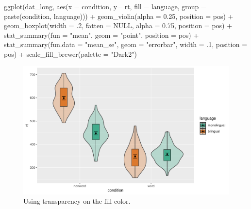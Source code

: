 \documentclass[
  english,
  doc,floatsintext]{apa6}
\newenvironment{Shaded}{\begin{snugshade}}{\end{snugshade}}
\newcommand{\AttributeTok}[1]{\textcolor[rgb]{0.77,0.63,0.00}{#1}}
\newcommand{\ConstantTok}[1]{\textcolor[rgb]{0.00,0.00,0.00}{#1}}
\newcommand{\DecValTok}[1]{\textcolor[rgb]{0.00,0.00,0.81}{#1}}
\newcommand{\FloatTok}[1]{\textcolor[rgb]{0.00,0.00,0.81}{#1}}
\newcommand{\FunctionTok}[1]{\textcolor[rgb]{0.00,0.00,0.00}{#1}}
\newcommand{\NormalTok}[1]{#1}
\newcommand{\SpecialCharTok}[1]{\textcolor[rgb]{0.00,0.00,0.00}{#1}}
\newcommand{\StringTok}[1]{\textcolor[rgb]{0.31,0.60,0.02}{#1}}
\begin{document}
\begin{Shaded}
\begin{Highlighting}[]
\FunctionTok{ggplot}\NormalTok{(dat\_long, }\FunctionTok{aes}\NormalTok{(}\AttributeTok{x =}\NormalTok{ condition, }\AttributeTok{y=}\NormalTok{ rt, }\AttributeTok{fill =}\NormalTok{ language, }
                     \AttributeTok{group =} \FunctionTok{paste}\NormalTok{(condition, language))) }\SpecialCharTok{+}
  \FunctionTok{geom\_violin}\NormalTok{(}\AttributeTok{alpha =} \FloatTok{0.25}\NormalTok{, }\AttributeTok{position =}\NormalTok{ pos) }\SpecialCharTok{+}
  \FunctionTok{geom\_boxplot}\NormalTok{(}\AttributeTok{width =}\NormalTok{ .}\DecValTok{2}\NormalTok{, }
               \AttributeTok{fatten =} \ConstantTok{NULL}\NormalTok{, }
               \AttributeTok{alpha =} \FloatTok{0.75}\NormalTok{,}
               \AttributeTok{position =}\NormalTok{ pos) }\SpecialCharTok{+}
  \FunctionTok{stat\_summary}\NormalTok{(}\AttributeTok{fun =} \StringTok{"mean"}\NormalTok{, }
               \AttributeTok{geom =} \StringTok{"point"}\NormalTok{, }
               \AttributeTok{position =}\NormalTok{ pos) }\SpecialCharTok{+}
  \FunctionTok{stat\_summary}\NormalTok{(}\AttributeTok{fun.data =} \StringTok{"mean\_se"}\NormalTok{, }
               \AttributeTok{geom =} \StringTok{"errorbar"}\NormalTok{, }
               \AttributeTok{width =}\NormalTok{ .}\DecValTok{1}\NormalTok{,}
               \AttributeTok{position =}\NormalTok{ pos) }\SpecialCharTok{+}
  \FunctionTok{scale\_fill\_brewer}\NormalTok{(}\AttributeTok{palette =} \StringTok{"Dark2"}\NormalTok{)}
\end{Highlighting}
\end{Shaded}

\begin{figure}

{\centering \includegraphics[width=1\linewidth]{images/viobox6-1} 

}

\caption{Using transparency on the fill color.}\label{fig:viobox6}
\end{figure}
\end{document}
